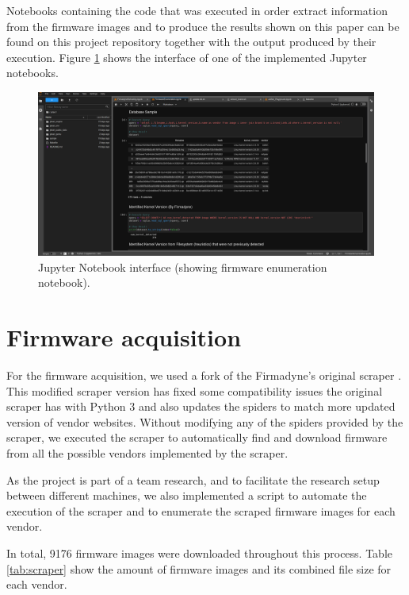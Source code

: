 Notebooks containing the code that was executed in order extract information from the firmware images and to produce the results shown on this paper can be found on this project repository \cite{github:c2dc-toso} together with the output produced by their execution. Figure \ref{fig:jupyter} shows the interface of one of the implemented Jupyter notebooks.

\begin{figure}[H]
    \centering
    \includegraphics[width=1.0\textwidth]{figs/jupyter.png}
    \caption{Jupyter Notebook interface (showing firmware enumeration notebook).}
    \label{fig:jupyter}
\end{figure}

\section{Firmware acquisition}
\label{sec:firmware-aquisition}

For the firmware acquisition, we used a fork of the Firmadyne's \cite{firmadyne} original scraper \cite{github:scraper}. This modified scraper version has fixed some compatibility issues the original scraper has with Python 3 and also updates the spiders to match more updated version of vendor websites. Without modifying any of the spiders provided by the scraper, we executed the scraper to automatically find and download firmware from all the possible vendors implemented by the scraper.

As the project is part of a team research, and to facilitate the research setup between different machines, we also implemented a script to automate the execution of the scraper and to enumerate the scraped firmware images for each vendor.

In total, 9176 firmware images were downloaded throughout this process. Table \ref{tab:scraper} show the amount of firmware images and its combined file size for each vendor.

